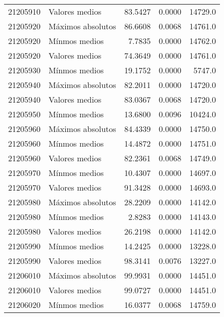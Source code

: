 \begin{longtable}{llrrr}
 21205910 &     Valores medios &       83.5427 &         0.0000 &         14729.0 \\
 21205920 &  Máximos absolutos &       86.6608 &         0.0068 &         14761.0 \\
 21205920 &      Mínmos medios &        7.7835 &         0.0000 &         14762.0 \\
 21205920 &     Valores medios &       74.3649 &         0.0000 &         14761.0 \\
 21205930 &      Mínmos medios &       19.1752 &         0.0000 &          5747.0 \\
 21205940 &  Máximos absolutos &       82.2011 &         0.0000 &         14720.0 \\
 21205940 &     Valores medios &       83.0367 &         0.0068 &         14720.0 \\
 21205950 &      Mínmos medios &       13.6800 &         0.0096 &         10424.0 \\
 21205960 &  Máximos absolutos &       84.4339 &         0.0000 &         14750.0 \\
 21205960 &      Mínmos medios &       14.4872 &         0.0000 &         14751.0 \\
 21205960 &     Valores medios &       82.2361 &         0.0068 &         14749.0 \\
 21205970 &      Mínmos medios &       10.4307 &         0.0000 &         14697.0 \\
 21205970 &     Valores medios &       91.3428 &         0.0000 &         14693.0 \\
 21205980 &  Máximos absolutos &       28.2209 &         0.0000 &         14142.0 \\
 21205980 &      Mínmos medios &        2.8283 &         0.0000 &         14143.0 \\
 21205980 &     Valores medios &       26.2198 &         0.0000 &         14142.0 \\
 21205990 &      Mínmos medios &       14.2425 &         0.0000 &         13228.0 \\
 21205990 &     Valores medios &       98.3141 &         0.0076 &         13227.0 \\
 21206010 &  Máximos absolutos &       99.9931 &         0.0000 &         14451.0 \\
 21206010 &     Valores medios &       99.0727 &         0.0000 &         14451.0 \\
 21206020 &      Mínmos medios &       16.0377 &         0.0068 &         14759.0 \\

\end{longtable}
